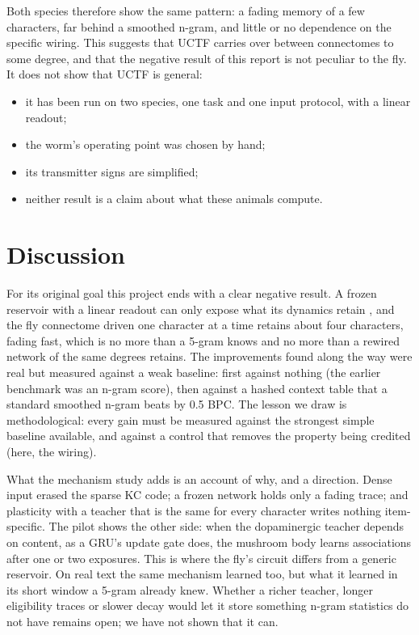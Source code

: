 \documentclass[conference]{IEEEtran}
\begin{document}
Both species therefore show the same pattern: a fading memory of a few
characters, far behind a smoothed n-gram, and little or no dependence on the
specific wiring. This suggests that UCTF carries over between connectomes to
some degree, and that the negative result of this report is not peculiar to
the fly. It does not show that UCTF is general:
\begin{itemize}
\item it has been run on two species, one task and one input protocol, with a
linear readout;
\item the worm's operating point was chosen by hand;
\item its transmitter signs are simplified;
\item neither result is a claim about what these animals compute.
\end{itemize}

\section{Discussion}
For its original goal this project ends with a clear negative result. A frozen
reservoir with a linear readout can only expose what its dynamics retain
\cite{lukosevicius2009}, and the fly connectome driven one character at a time
retains about four characters, fading fast, which is no more than a 5-gram
knows and no more than a rewired network of the same degrees retains. The
improvements found along the way were real but measured against a weak
baseline: first against nothing (the earlier benchmark was an n-gram score),
then against a hashed context table that a standard smoothed n-gram beats by
0.5 BPC. The lesson we draw is methodological: every gain must be measured
against the strongest simple baseline available, and against a control that
removes the property being credited (here, the wiring).

What the mechanism study adds is an account of why, and a direction. Dense
input erased the sparse KC code; a frozen network holds only a fading trace;
and plasticity with a teacher that is the same for every character writes
nothing item-specific. The pilot shows the other side: when the dopaminergic
teacher depends on content, as a GRU's update gate does, the mushroom body
learns associations after one or two exposures. This is where the fly's
circuit differs from a generic reservoir. On real text the same mechanism
learned too, but what it learned in its short window a 5-gram already knew.
Whether a richer teacher, longer eligibility traces or slower decay would let
it store something n-gram statistics do not have remains open; we have not
shown that it can.
\end{document}
